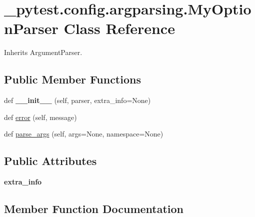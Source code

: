 \hypertarget{class__pytest_1_1config_1_1argparsing_1_1_my_option_parser}{}\section{\+\_\+pytest.\+config.\+argparsing.\+My\+Option\+Parser Class Reference}
\label{class__pytest_1_1config_1_1argparsing_1_1_my_option_parser}


Inherits Argument\+Parser.

\subsection*{Public Member Functions}
\begin{DoxyCompactItemize}
\item 
\mbox{\label{class__pytest_1_1config_1_1argparsing_1_1_my_option_parser_aa68cc66c3f49a7c937c7e06034a0d706}} 
def {\bfseries \+\_\+\+\_\+init\+\_\+\+\_\+} (self, parser, extra\+\_\+info=None)
\item 
def \hyperlink{class__pytest_1_1config_1_1argparsing_1_1_my_option_parser_afdd988994d7c7e21780f467ab4fe36bd}{error} (self, message)
\item 
def \hyperlink{class__pytest_1_1config_1_1argparsing_1_1_my_option_parser_ace320dcd318376d6ad4116fafc1f0270}{parse\+\_\+args} (self, args=None, namespace=None)
\end{DoxyCompactItemize}
\subsection*{Public Attributes}
\begin{DoxyCompactItemize}
\item 
\mbox{\label{class__pytest_1_1config_1_1argparsing_1_1_my_option_parser_a59809e63a6097c52b5aa0156a377dc49}} 
{\bfseries extra\+\_\+info}
\end{DoxyCompactItemize}


\subsection{Member Function Documentation}
\mbox{\label{class__pytest_1_1config_1_1argparsing_1_1_my_option_parser_afdd988994d7c7e21780f467ab4fe36bd}} 
